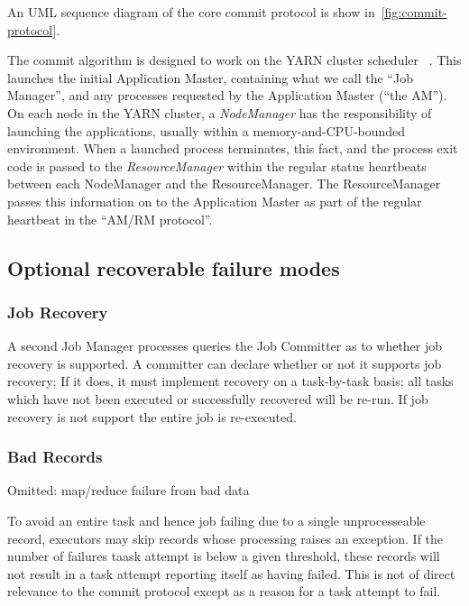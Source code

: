 \documentclass[conference]{IEEEtran}
\begin{document}
An UML sequence diagram of the core commit protocol is
show in\ \ref{fig:commit-protocol}.

The commit algorithm is designed to work on the YARN cluster scheduler
\ \cite{Vavilapalli2013}.
This launches the initial Application Master, containing what we call
the ``Job Manager'', and any processes requested by the Application Master
(``the AM'').
On each node in the YARN cluster, a \emph{NodeManager} has the responsibility
of launching the applications, usually within a memory-and-CPU-bounded
environment.
When a launched process terminates, this fact, and the process exit code
is passed to the \emph{ResourceManager} within the regular status heartbeats
between each NodeManager and the ResourceManager.
The ResourceManager passes this information on to the Application Master
as part of the regular heartbeat in the ``AM/RM protocol''.


\subsection{Optional recoverable failure modes}
\label{subsec:optionalRecoverableFailureModes}

\subsubsection{Job Recovery}

A second Job Manager processes queries the Job Committer as to whether job
recovery is supported.
A committer can declare whether or not it supports job recovery;
If it does, it must implement recovery on a task-by-task basis;
all tasks which have not been executed or successfully recovered will be
re-run.
If job recovery is not support the entire job is re-executed.

\subsubsection{Bad Records}

Omitted: map/reduce failure from bad data

To avoid an entire task and hence job failing due to a single unprocesseable record,
executors may skip records whose processing raises an exception.
If the number of failures taask attempt is below a given
threshold, these records will not result in a task attempt reporting itself as
having failed.
This is not of direct relevance to the commit protocol except as a
reason for a task attempt to fail.
\end{document}
